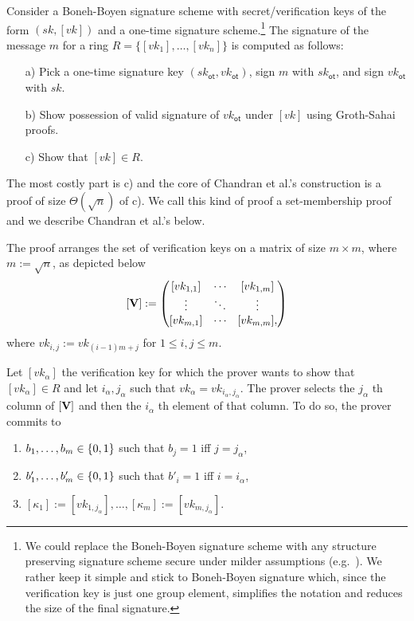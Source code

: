 Consider a {Boneh-Boyen signature scheme} with secret/verification keys of the form $(sk,[vk])$ and a {one-time signature scheme}.\footnote{We could replace the Boneh-Boyen signature scheme with any structure preserving signature scheme secure under milder assumptions (e.g.~\cite{EPRINT:JutRoy17}). We rather keep it simple and stick to Boneh-Boyen signature which, since the verification key is just one group element, simplifies the notation and reduces the size of the final signature.} The signature of the message $m$ for a ring $R=\{[vk_1],\ldots,[vk_n]\}$ is computed as follows:
\begin{itemize}
	\item[a)] Pick a one-time signature key $(sk_\mathsf{ot},vk_\mathsf{ot})$, sign $m$ with $sk_\mathsf{ot}$, and sign $vk_\mathsf{ot}$ with $sk$.
	\item[b)] Show possession of valid signature of $vk_\mathsf{ot}$ under $[vk]$ using Groth-Sahai proofs.
	\item[c)] Show that $[vk]\in R$.
\end{itemize}
The most costly part is c) and the core of Chandran et al.'s construction is a proof of size $\Theta(\sqrt{n})$ of c). We call this kind of proof a set-membership proof and we describe Chandran et al.'s below.
 
The proof arranges the set of verification keys on a matrix of size $m\times m$, where $m:=\sqrt{n}$, as depicted below
$$
[\mathbf{{V}}]:=
\begin{pmatrix}
[vk_{1,1}] & \cdots & [vk_{1,m}]\\
\vdots     & \ddots & \vdots \\
[vk_{m,1}]  & \cdots & [vk_{m,m}],
\end{pmatrix}
$$
where $vk_{i,j}:=vk_{(i-1)m+j}$ for $1\leq i,j \leq m$.

Let $[vk_\alpha]$ the verification key for which the prover wants to show that $[vk_\alpha]\in R$ and let $i_\alpha,j_\alpha$ such that $vk_\alpha = vk_{i_\alpha,j_\alpha}$. The prover selects the $j_\alpha$ th column of $[\mathbf{{V}}]$ and then the $i_\alpha$ th element of that column. To do so, the prover commits to 
\begin{enumerate}
\item $b_1,\ldots,b_m\in\{0,1\}$ such that $b_j=1$ iff $j=j_\alpha$,
\item $b'_1,\ldots,b'_m\in\{0,1\}$ such that $b'_i=1$ iff $i=i_\alpha$,
\item $[\kappa_1]:=[vk_{1,j_\alpha}],\ldots,[\kappa_m]:=[vk_{m,j_\alpha}]$.
\end{enumerate}

